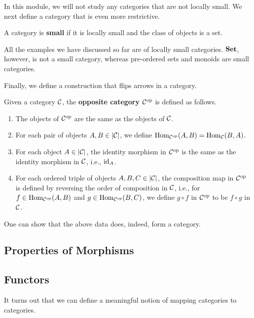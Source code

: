 In this module, we will not study any categories that are not locally small. We next define a category that is even more restrictive.

\begin{boxdefinition}
    A category is \textbf{small} if it is locally small and the class of objects is a set.
\end{boxdefinition}

All the examples we have discussed so far are of locally small categories. $\mathbf{Set}$, however, is not a small category, whereas pre-ordered sets and monoids are small categories.

Finally, we define a construction that flips arrows in a category.

\begin{boxdefinition}
    Given a category $\mathcal{C}$, the \textbf{opposite category} $\mathcal{C}^{\operatorname{op}}$ is defined as follows.
    \begin{enumerate}
        \item The objects of $\mathcal{C}^{\operatorname{op}}$ are the same as the objects of $\mathcal{C}$.
        \item For each pair of objects $A, B \in \left\lvert \mathcal{C} \right\rvert$, we define $\operatorname{Hom}_{\mathcal{C}^{\operatorname{op}}}(A, B) = \operatorname{Hom}_{\mathcal{C}}\!\left( B, A \right)$.
        \item For each object $A \in \left\lvert \mathcal{C} \right\rvert$, the identity morphism in $\mathcal{C}^{\operatorname{op}}$ is the same as the identity morphism in $\mathcal{C}$, i.e., $\operatorname{id}_A$.
        \item For each ordered triple of objects $A, B, C \in \left\lvert \mathcal{C} \right\rvert$, the composition map in $\mathcal{C}^{\operatorname{op}}$ is defined by reversing the order of composition in $\mathcal{C}$, i.e., for $f \in \operatorname{Hom}_{\mathcal{C}^{\operatorname{op}}}(A, B)$ and $g \in \operatorname{Hom}_{\mathcal{C}^{\operatorname{op}}}(B, C)$, we define $g \circ f$ in $\mathcal{C}^{\operatorname{op}}$ to be $f \circ g$ in $\mathcal{C}$.
    \end{enumerate}
    One can show that the above data does, indeed, form a category.
\end{boxdefinition}

\subsection{Properties of Morphisms}

\sorry

\subsection{Functors}

It turns out that we can define a meaningful notion of mapping categories to categories.

